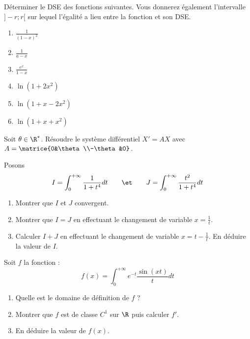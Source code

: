 \documentclass[french,11pt,twoside]{VcCours}
\begin{document}


\begin{Exercice}
  Déterminer le DSE des fonctions suivantes. Vous donnerez également 
  l'intervalle $]-r;r[$ sur lequel l'égalité a lieu entre
  la fonction et son DSE.
  \begin{multicols}{3}
  \begin{enumerate}
  \item $\frac{1}{(1-x)^2}$
  \item $\frac1{a-x}$
  \item $\frac {e^x}{1-x}$
  \item $\ln(1+2x^2)$
  \item $\ln(1+x-2x^2)$
  \item $\ln(1+x+x^2)$
  \end{enumerate}
  \end{multicols}
\end{Exercice}


\begin{Exercice}
  Soit $\theta\in\R^*$. Résoudre le système différentiel $X'=AX$ avec 
  $A=\matrice{0&\theta\\-\theta&0}$.
\end{Exercice}


\begin{Exercice}
  Posons
  \[I=\int_0^{+\infty}\frac1{1+t^4}dt
  \qquad\et\qquad 
  J=\int_0^{+\infty}\frac{t^2}{1+t^4}dt\]
  \begin{enumerate}
    \item Montrer que $I$ et $J$ convergent.
    \item Montrer que $I = J$ en effectuant le changement de variable $x=\frac1t$.
    \item Calculer $I+J$ en effectuant le changement de variable $x=t-\frac1t$.
    En déduire la valeur de $I$.
  \end{enumerate}
\end{Exercice}


\begin{Exercice}
  Soit $f$ la fonction :
  \[f(x)=\int_0^{+\infty}e^{-t}\frac{\sin(xt)}{t}dt\]
  \begin{enumerate}
    \item Quelle est le domaine de définition de $f$ ?
    \item Montrer que $f$ est de classe $C^1$ sur $\R$ puis calculer $f'$.
    \item En déduire la valeur de $f(x)$.
\end{enumerate}
\end{Exercice}
\end{document}
